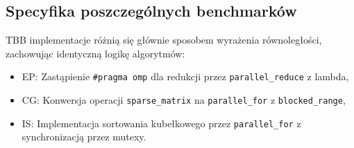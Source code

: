 \subsection{Specyfika poszczególnych benchmarków}
TBB implementacje różnią się głównie sposobem wyrażenia równoległości, zachowując identyczną logikę algorytmów:
\begin{itemize}
    \item EP: Zastąpienie \texttt{\#pragma omp} dla redukcji przez \texttt{parallel\_reduce} z lambda,
    \item CG: Konwersja operacji \texttt{sparse\_matrix} na \texttt{parallel\_for} z \texttt{blocked\_range},
    \item IS: Implementacja sortowania kubełkowego przez \texttt{parallel\_for} z synchronizacją przez mutexy.
\end{itemize}